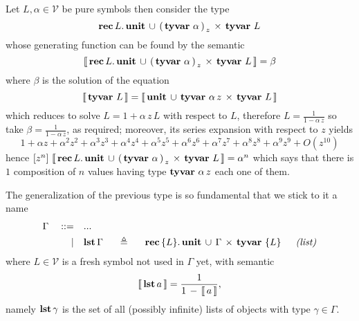 \begin{example}
Let $L,\alpha\in\mathcal{V}$ be pure symbols then consider the type
\begin{displaymath}
    \textbf{rec}\,L.\,\textbf{unit}\,\cup\,{\left(\,\textbf{tyvar}\,\,\alpha\,\right)}_{\,z}\,\times\,\textbf{tyvar}\,\,L
\end{displaymath}
whose generating function can be found by the semantic
\begin{displaymath}
    \left\llbracket\,\textbf{rec}\,L.\,\textbf{unit}\,\cup\,{\left(\,\textbf{tyvar}\,\,\alpha\,\right)}_{\,z}\,\times\,\textbf{tyvar}\,\,L\,\right\rrbracket = \beta
\end{displaymath}
where $\beta$ is the solution of the equation
\begin{displaymath}
    \left\llbracket\,\textbf{tyvar}\,\,L\,\right\rrbracket = \left\llbracket\,\textbf{unit}\,\cup\,\textbf{tyvar}\,\,\alpha\,z\,\times\,\textbf{tyvar}\,\,L\,\right\rrbracket
\end{displaymath}
which reduces to solve $L = 1 + \alpha\,z\,L$ with respect to $L$, therefore
$\displaystyle L = \frac{1}{1 - \alpha\,z}$ so take $\displaystyle \beta =
\frac{1}{1 - \alpha\,z}$, as required; moreover, its series expansion with
respect to $z$ yields
\begin{displaymath}
1 + \alpha z + \alpha^{2} z^{2} + \alpha^{3} z^{3} + \alpha^{4} z^{4} + \alpha^{5} z^{5} + \alpha^{6} z^{6} + \alpha^{7} z^{7} + \alpha^{8} z^{8} + \alpha^{9} z^{9} + O\left(z^{10}\right)
\end{displaymath}
hence
$[z^{n}]\,\left\llbracket\,\textbf{rec}\,L.\,\textbf{unit}\,\cup\,{\left(\,\textbf{tyvar}\,\,\alpha\,\right)}_{\,z}\,\times\,\textbf{tyvar}\,\,L\,\right\rrbracket
= \alpha^{n}$ which says that there is $1$ composition of $n$ values having
type $\textbf{tyvar}\,\,\alpha\,z$ each one of them.
\end{example}

\begin{definition}
The generalization of the previous type is so fundamental that we stick to it a name
\begin{displaymath}
\begin{split}
    \Gamma\quad::=\quad&... \\
           |\quad&\tydef{\tylst{\Gamma}}{\tyrec{ \lbrace L \rbrace}{\tydu{\tyunit}{\tycp{\Gamma}{\tyvar{ \lbrace L \rbrace}}}}}{list}
\end{split}
\end{displaymath}
where $L\in\mathcal{V}$ is a fresh symbol not used in $\Gamma$ yet, with semantic
\begin{displaymath}
    \left\llbracket\,\textbf{lst}\,a\,\right\rrbracket = \frac{1}{1\,-\,\left\llbracket\,a\,\right\rrbracket},
\end{displaymath}
namely $\textbf{lst}\,\gamma$ is the set of all (possibly infinite) lists of
objects with type $\gamma\in\Gamma$.
\end{definition}

